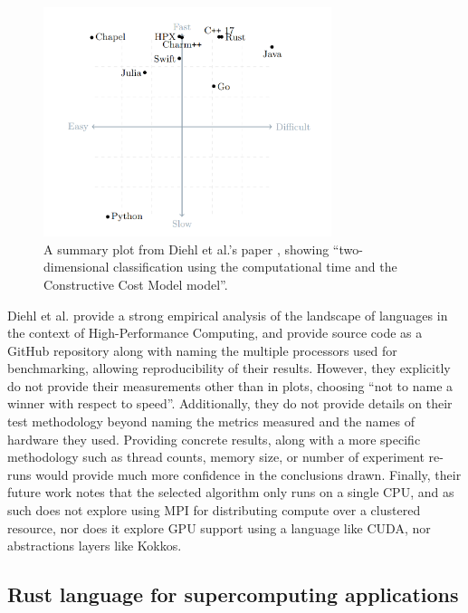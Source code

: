 \begin{figure}[H]
    \centering
    \includegraphics[width=0.75\textwidth]{images/2_background/1d_heat_results.png}
    \caption{A summary plot from Diehl et al.'s paper \cite{diehlBenchmarkingParallel1D2023}, showing ``two-dimensional classification using the computational time and the Constructive Cost Model model''.}
    \label{fig:1d_heat_results}
\end{figure}

Diehl et al. provide a strong empirical analysis of the landscape of languages in the context of High-Performance Computing, and provide source code as a GitHub repository \cite{} along with naming the multiple processors used for benchmarking, allowing reproducibility of their results. However, they explicitly do not provide their measurements other than in plots, choosing ``not to name a winner with respect to speed''. Additionally, they do not provide details on their test methodology beyond naming the metrics measured and the names of hardware they used. Providing concrete results, along with a more specific methodology such as thread counts, memory size, or number of experiment re-runs would provide much more confidence in the conclusions drawn. Finally, their future work notes that the selected algorithm only runs on a single CPU, and as such does not explore using MPI for distributing compute over a clustered resource, nor does it explore GPU support using a language like CUDA, nor abstractions layers like Kokkos.

\subsection{Rust language for supercomputing applications}
\label{ssec:bychkov-nikolskiy}

